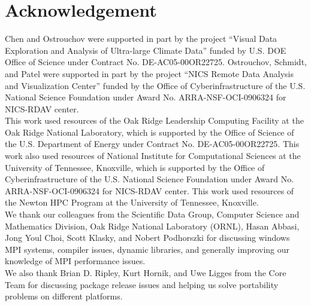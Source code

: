 
\section*{Acknowledgement}

Chen and Ostrouchov were supported in part by the project
``Visual Data Exploration and Analysis of Ultra-large Climate Data''
funded by U.S. DOE Office of Science
under Contract No. DE-AC05-00OR22725.
Ostrouchov, Schmidt, and Patel were supported in part by the project
``NICS Remote Data Analysis and Visualization Center''
funded by the Office of Cyberinfrastructure of the
U.S. National Science Foundation
under Award No. ARRA-NSF-OCI-0906324 for NICS-RDAV center.
\\

This work used resources of the Oak Ridge Leadership Computing Facility at the
Oak Ridge National Laboratory, which is supported by the Office of Science
of the U.S. Department of Energy under Contract No. DE-AC05-00OR22725.
This work also used resources of National Institute for Computational
Sciences at the University of Tennessee, Knoxville, which is supported
by the Office of Cyberinfrastructure of the U.S. National Science Foundation
under Award No. ARRA-NSF-OCI-0906324 for NICS-RDAV center.
This work used resources of the Newton HPC Program at the University of
Tennessee, Knoxville.
\\

We thank our colleagues from the Scientific Data Group, Computer
Science and Mathematics Division, Oak Ridge National Laboratory
(ORNL), Hasan Abbasi, Jong Youl Choi, Scott Klasky, and Nobert
Podhorszki for discussing windows MPI systems, compiler issues,
dynamic libraries, and generally improving our knowledge of MPI
performance issues.
\\

We also thank Brian D. Ripley, Kurt Hornik, and Uwe Ligges from the
 Core Team for discussing package release issues and
helping us solve portability problems on different platforms.
\\
